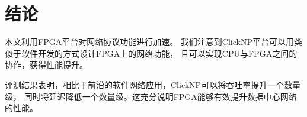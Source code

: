 \chapter{结论}
本文利用FPGA平台对网络协议功能进行加速。
我们注意到ClickNP平台可以用类似于软件开发的方式设计FPGA上的网络功能，
且可以实现CPU与FPGA之间的协作，获得性能提升。

评测结果表明，相比于前沿的软件网络应用，ClickNP可以将吞吐率提升一个数量级，
同时将延迟降低一个数量级。这充分说明FPGA能够有效提升数据中心网络的性能。
